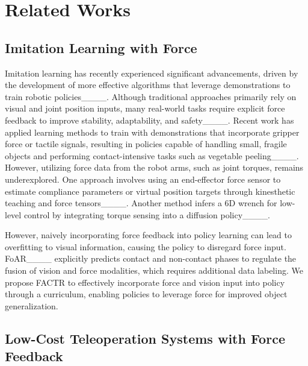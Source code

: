 \section{Related Works}
\subsection{Imitation Learning with Force}

Imitation learning has recently experienced significant advancements, driven by the development of more effective algorithms that leverage demonstrations to train robotic policies____. Although traditional approaches primarily rely on visual and joint position inputs, many real-world tasks require explicit force feedback to improve stability, adaptability, and safety____. 
Recent work has applied learning methods to train with demonstrations that incorporate gripper force or tactile signals, resulting in policies capable of handling small, fragile objects and performing contact-intensive tasks such as vegetable peeling____. However, utilizing force data from the robot arms, such as joint torques, remains underexplored. One approach involves using an end-effector force sensor to estimate compliance parameters or virtual position targets through kinesthetic teaching and force tensors____. Another method infers a 6D wrench for low-level control by integrating torque sensing into a diffusion policy____.

However, naively incorporating force feedback into policy learning can lead to overfitting to visual information, causing the policy to disregard force input. FoAR____ explicitly predicts contact and non-contact phases to regulate the fusion of vision and force modalities, which requires additional data labeling. We propose FACTR to effectively incorporate force and vision input into policy through a curriculum, enabling policies to leverage force for improved object generalization.

\subsection{Low-Cost Teleoperation Systems with Force Feedback}


